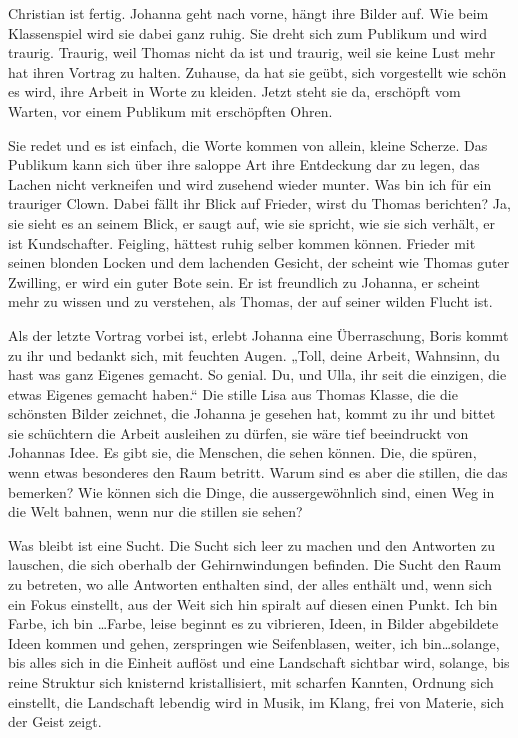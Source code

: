 \documentclass[10pt,titlepage,a5paper]{book}
\begin{document}
Christian ist fertig. Johanna geht nach vorne, hängt ihre Bilder auf. Wie beim Klassenspiel wird sie dabei ganz ruhig. Sie dreht sich zum Publikum und wird traurig. Traurig, weil Thomas nicht da ist und traurig, weil sie keine Lust mehr hat ihren Vortrag zu halten. Zuhause, da hat sie geübt, sich vorgestellt wie schön es wird, ihre Arbeit in Worte zu kleiden. Jetzt steht sie da, erschöpft vom Warten, vor einem Publikum mit erschöpften Ohren.

Sie redet und es ist einfach, die Worte kommen von allein, kleine Scherze. Das Publikum kann sich über ihre saloppe Art ihre Entdeckung dar zu legen, das Lachen nicht verkneifen und wird zusehend wieder munter. Was bin ich für ein trauriger Clown. Dabei fällt ihr Blick auf Frieder, wirst du Thomas berichten? Ja, sie sieht es an seinem Blick, er saugt auf, wie sie spricht, wie sie sich verhält, er ist Kundschafter. Feigling, hättest ruhig selber kommen können. Frieder mit seinen blonden Locken und dem lachenden Gesicht, der scheint wie Thomas guter Zwilling, er wird ein guter Bote sein. Er ist freundlich zu Johanna, er scheint mehr zu wissen und zu verstehen, als Thomas, der auf seiner wilden Flucht ist.

Als der letzte Vortrag vorbei ist, erlebt Johanna eine Überraschung, Boris kommt zu ihr und bedankt sich, mit feuchten Augen. „Toll, deine Arbeit, Wahnsinn, du hast was ganz Eigenes gemacht. So genial. Du, und Ulla, ihr seit die einzigen, die etwas Eigenes gemacht haben.“ Die stille Lisa aus Thomas Klasse, die die schönsten Bilder zeichnet, die Johanna je gesehen hat, kommt zu ihr und bittet sie schüchtern die Arbeit ausleihen zu dürfen, sie wäre tief beeindruckt von Johannas Idee. Es gibt sie, die Menschen, die sehen können. Die, die spüren, wenn etwas besonderes den Raum betritt. Warum sind es aber die stillen, die das bemerken? Wie können sich die Dinge, die aussergewöhnlich sind, einen Weg in die Welt bahnen, wenn nur die stillen sie  sehen?

Was bleibt ist eine Sucht. Die Sucht sich leer zu machen und den Antworten zu lauschen, die sich oberhalb der Gehirnwindungen befinden. Die Sucht den Raum zu betreten, wo alle Antworten enthalten sind, der alles enthält und, wenn sich ein Fokus einstellt, aus der Weit sich hin spiralt auf diesen einen Punkt. 
Ich bin Farbe, ich bin \dots Farbe, leise beginnt es zu vibrieren, Ideen, in Bilder abgebildete Ideen kommen und gehen, zerspringen wie Seifenblasen, weiter, ich bin\dots  solange, bis alles sich in die Einheit auflöst und eine Landschaft sichtbar wird, solange, bis reine Struktur sich knisternd kristallisiert, mit scharfen Kannten, Ordnung sich einstellt, die Landschaft lebendig wird in Musik, im Klang, frei von Materie, sich der Geist zeigt. 
\end{document}
